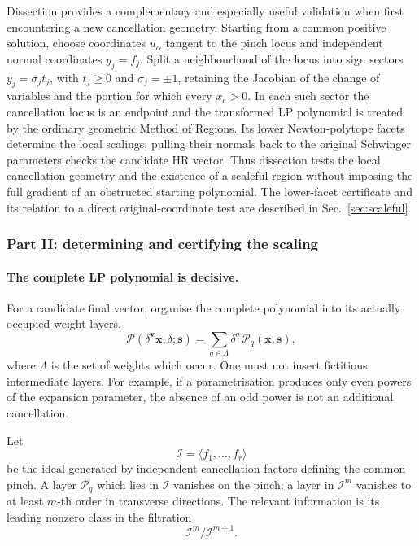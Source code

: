 \documentclass[a4paper,11pt]{article}
\newcommand{\x}{\boldsymbol{x}}
\newcommand{\s}{\boldsymbol{s}}
\newcommand{\ideal}{\mathcal I}
\begin{document}
Dissection provides a complementary and especially useful validation when
first encountering a new cancellation geometry.  Starting from a common
positive solution, choose coordinates \(u_\alpha\) tangent to the pinch
locus and independent normal coordinates \(y_j=f_j\).  Split a neighbourhood
of the locus into sign sectors \(y_j=\sigma_j t_j\), with
\(t_j\geq0\) and \(\sigma_j=\pm1\), retaining the Jacobian of the change of
variables and the portion for which every \(x_e>0\).  In each such sector
the cancellation locus is an endpoint and
the transformed LP polynomial is treated by the ordinary geometric Method
of Regions.  Its lower Newton-polytope facets determine the local scalings;
pulling their normals back to the original Schwinger parameters checks the
candidate HR vector.  Thus dissection tests the local cancellation geometry
and the existence of a scaleful region without imposing the full gradient of
an obstructed starting polynomial.  The lower-facet certificate and its
relation to a direct original-coordinate test are described in
Sec.~\ref{sec:scaleful}.

\subsubsection{Part II: determining and certifying the scaling}
\label{sec:layers}

\paragraph{The complete LP polynomial is decisive.}

For a candidate final vector, organise the complete polynomial into its
actually occupied weight layers,
\begin{equation}
 \mathcal P(\delta^{\boldsymbol v}\x,\delta;\s)
 =
 \sum_{q\in\Lambda}
 \delta^q\,\mathcal P_q(\x,\s),
\label{eq:weightlayers}
\end{equation}
where \(\Lambda\) is the set of weights which occur.  One must not insert
fictitious intermediate layers.  For example, if a parametrisation produces
only even powers of the expansion parameter, the absence of an odd power is
not an additional cancellation.

Let
\begin{equation}
 \ideal=\langle f_1,\ldots,f_r\rangle
\label{eq:pinchideal}
\end{equation}
be the ideal generated by independent cancellation factors defining the
common pinch.  A layer \(\mathcal P_q\) which lies in \(\ideal\) vanishes on
the pinch; a layer in \(\ideal^m\) vanishes to at least \(m\)-th order in
transverse directions.  The relevant information is its leading nonzero
class in the filtration
\begin{equation}
 \ideal^m/\ideal^{m+1}.
\label{eq:Iadic}
\end{equation}
\end{document}
